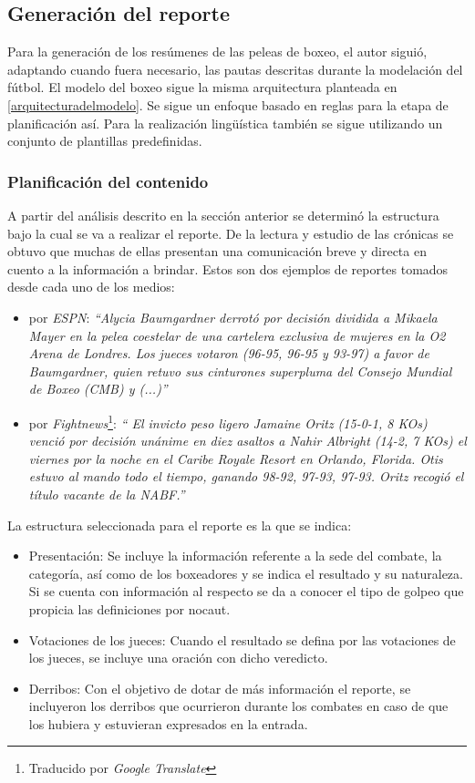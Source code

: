 \subsection{Generación del reporte}

    Para la generación de los resúmenes de las peleas de boxeo, el autor siguió, adaptando cuando fuera necesario, las pautas descritas durante la 
modelación del fútbol. El modelo del boxeo sigue la misma arquitectura planteada en \ref{arquitecturadelmodelo}. Se sigue un enfoque basado en reglas 
para la etapa de planificación así. Para la realización lingüística también se sigue utilizando un conjunto de plantillas predefinidas.

\subsubsection{Planificación del contenido}

A partir del análisis descrito en la sección anterior se determinó la estructura bajo la cual se va a realizar el reporte. De la lectura y estudio de 
las crónicas se obtuvo que muchas de ellas presentan una comunicación breve y directa en cuento a la información a brindar. Estos son dos ejemplos de 
reportes tomados desde cada uno de los medios:

    \begin{itemize}
        \item por \textit{ESPN}: \textit{“Alycia Baumgardner derrotó por decisión dividida a Mikaela Mayer en la pelea coestelar de una cartelera exclusiva de mujeres en la O2 Arena de Londres. 
        Los jueces votaron (96-95, 96-95 y 93-97) a favor de Baumgardner, quien retuvo sus cinturones superpluma del Consejo Mundial de Boxeo (CMB) y (...)”}
        \item por \textit{Fightnews}\footnote[1]{Traducido por \textit{Google Translate}}: \textit{“ El invicto peso ligero Jamaine Oritz (15-0-1, 8 KOs) venció por decisión unánime en diez asaltos a Nahir Albright (14-2, 7 KOs) el viernes por la noche 
        en el Caribe Royale Resort en Orlando, Florida. Otis estuvo al mando todo el tiempo, ganando 98-92, 97-93, 97-93. Oritz recogió el título vacante de la NABF.”}
    \end{itemize}

    La estructura seleccionada para el reporte es la que se indica:
    \begin{itemize}
        \item  Presentación: Se incluye la información referente a la sede del combate, la categoría, así como de los boxeadores y se indica el resultado y su naturaleza. Si se cuenta 
        con información al respecto se da a conocer el tipo de golpeo que propicia las definiciones por nocaut.
        \item Votaciones de los jueces: Cuando el resultado se defina por las votaciones de los jueces, se incluye una oración con dicho veredicto.
        \item Derribos: Con el objetivo de dotar de más información el reporte, se incluyeron los derribos que ocurrieron durante los combates en caso de que 
        los hubiera y estuvieran expresados en la entrada.
    \end{itemize}

